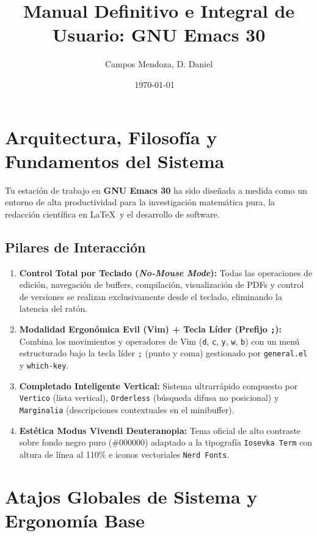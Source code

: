 \documentclass[11pt,book,spanish,alphabetic]{apuntes-scr}
\title[Guía Operativa Exhaustiva: Ergonomía Modal, Ecosistema LaTeX, Snippets AAS/LAAS, TeX-Fold, Segundo Cerebro e IA]{Manual Definitivo e Integral de Usuario: GNU Emacs 30}
\author{Campos Mendoza, D. Daniel}
\date{\today\ \textperiodcentered\ \DTMcurrenttime}
\begin{document}
\frontmatter
\maketitle
\tableofcontents

\mainmatter

\chapter{Arquitectura, Filosofía y Fundamentos del Sistema}

Tu estación de trabajo en \textbf{GNU Emacs 30} ha sido diseñada a medida como un entorno de alta productividad para la investigación matemática pura, la redacción científica en \LaTeX\ y el desarrollo de software.

\section{Pilares de Interacción}
\begin{enumerate}[label=\bfseries\arabic*., leftmargin=10mm]
    \item \textbf{Control Total por Teclado (\textit{No-Mouse Mode}):} Todas las operaciones de edición, navegación de buffers, compilación, visualización de PDFs y control de versiones se realizan exclusivamente desde el teclado, eliminando la latencia del ratón.
    \item \textbf{Modalidad Ergonómica Evil (Vim) + Tecla Líder (Prefijo \texttt{;}):} Combina los movimientos y operadores de Vim (\texttt{d}, \texttt{c}, \texttt{y}, \texttt{w}, \texttt{b}) con un menú estructurado bajo la tecla líder \texttt{;} (punto y coma) gestionado por \texttt{general.el} y \texttt{which-key}.
    \item \textbf{Completado Inteligente Vertical:} Sistema ultrarrápido compuesto por \texttt{Vertico} (lista vertical), \texttt{Orderless} (búsqueda difusa no posicional) y \texttt{Marginalia} (descripciones contextuales en el minibuffer).
    \item \textbf{Estética Modus Vivendi Deuteranopia:} Tema oficial de alto contraste sobre fondo negro puro (\#000000) adaptado a la tipografía \texttt{Iosevka Term} con altura de línea al 110\% e iconos vectoriales \texttt{Nerd Fonts}.
\end{enumerate}

\chapter{Atajos Globales de Sistema y Ergonomía Base}
\end{document}
